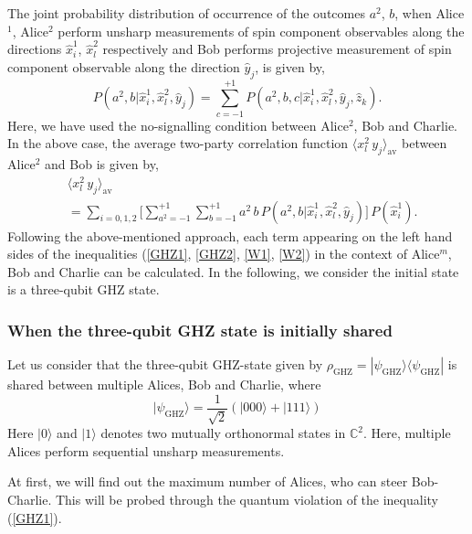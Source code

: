\documentclass[pra,a4paper,aps,twocolumn,showpacs,superscriptaddress,groupedaddress]{revtex4}
\begin{document}
The joint probability distribution of occurrence of the outcomes $a^2$, $b$, when Alice$^1$, Alice$^2$ perform unsharp measurements of spin component observables along the directions $\hat{x}^1_i$, $\hat{x}^2_l$ respectively and Bob performs projective measurement of spin component observable along the direction $\hat{y}_j$, is given by,
\begin{equation}
P(a^2, b|\hat{x}^1_i, \hat{x}^2_l, \hat{y}_j) = \sum_{c=-1}^{+1} P(a^2, b, c|\hat{x}^1_i, \hat{x}^2_l, \hat{y}_j, \hat{z}_k).
\end{equation}
Here, we have used the no-signalling condition between Alice$^2$, Bob and Charlie. 
In the above case, the average two-party correlation function $\langle x^2_l \, y_j  \rangle_{\text{av}}$ between Alice$^2$ and Bob is given by,
\begin{align}
& \langle x^2_l \, y_j  \rangle_{\text{av}} \nonumber \\
&= \sum_{i = 0,1,2} \Bigg[ \sum_{a^2 = -1}^{ +1} \sum_{b =  -1}^{ +1} a^2 \, b  \, P(a^2, b|\hat{x}^1_i, \hat{x}^2_l, \hat{y}_j) \Bigg] \, P(\hat{x}^1_i).
\label{avcor2}
\end{align}
Following the above-mentioned approach, each term appearing on the left hand sides of the inequalities (\ref{GHZ1}, \ref{GHZ2}, \ref{W1}, \ref{W2}) in the context of  Alice$^m$, Bob and Charlie can be calculated. In the following, we consider the initial state is a three-qubit GHZ state.

\subsubsection{When the three-qubit GHZ state is initially shared} \label{sub1}
Let us consider that the three-qubit GHZ-state \cite{GHZ} given by $\rho_{\text{GHZ}} = | \psi_{\text{GHZ}} \rangle \langle \psi_{\text{GHZ}} |$  is shared between multiple Alices, Bob and Charlie, where
\begin{equation}
|\psi_{\text{GHZ}} \rangle = \frac{1}{\sqrt{2}} ( |000 \rangle + | 111 \rangle )
\label{ghz}
\end{equation}
Here $|0\rangle$ and $|1\rangle$ denotes two mutually orthonormal states in $\mathbb{C}^2$. Here, multiple Alices perform sequential unsharp measurements.

 At first, we will find out the maximum number of Alices, who can steer Bob-Charlie. This will be probed through the quantum violation of the inequality (\ref{GHZ1}).

\end{document}
